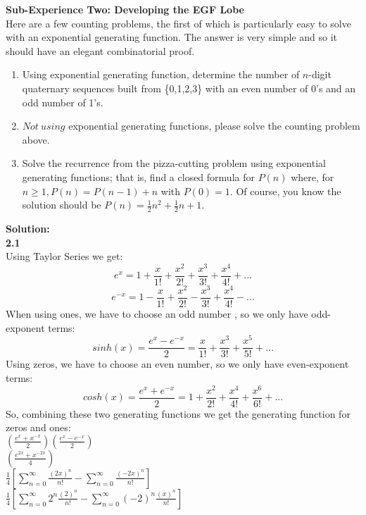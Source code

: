\documentclass[10pt,a4paper]{report}
\begin{document}
	\textbf{Sub-Experience Two: Developing the EGF Lobe}\\
	Here are a few counting problems, the first of which is particularly easy to solve with an exponential generating function.  The answer is very simple and so it should have an elegant combinatorial proof.
	\begin{enumerate}
		\item Using exponential generating function, determine the number of $n$-digit quaternary sequences built from \{0,1,2,3\} with an even number of 0's and an odd number of 1's.
		\item $Not\ using$ exponential generating functions, please solve the counting problem above.
		\item Solve the recurrence from the pizza-cutting problem using exponential generating functions; that is, find a closed formula for $P(n)$ where, for $n\geq1, P(n) = P(n-1) + n$ with $P(0) = 1$.  Of course, you know the solution should be $P(n) = \frac{1}{2}n^2 + \frac{1}{2}n + 1$.
	\end{enumerate}
	\textbf{Solution: }\\
	\newline
	\textbf{2.1}\\
	Using Taylor Series we get:\\
	\[e^x = 1 + \frac{x}{1!} + \frac{x^2}{2!} + \frac{x^3}{3!} + \frac{x^4}{4!} + ...\]
	\[e^{-x} = 1 - \frac{x}{1!} + \frac{x^2}{2!} - \frac{x^3}{3!} + \frac{x^4}{4!} - ...\]
	When using ones, we have to choose an odd number , so we only have odd-exponent terms:\\
	\[sinh(x) = \frac{e^x - e^{-x}}{2} = \frac{x}{1!} + \frac{x^3}{3!} + \frac{x^5}{5!} + ...\]
	Using zeros, we have to choose an even number, so we only have even-exponent terms:\\
	\[cosh(x) = \frac{e^x + e^{-x}}{2} = 1 + \frac{x^2}{2!} + \frac{x^4}{4!} + \frac{x^6}{6!} + ...\]
	So, combining these two generating functions we get the generating function for zeros and ones:\\
	$(\frac{e^x + x^{-x}}{2})(\frac{e^x - e^{-x}}{2}) $\\
	$(\frac{e^{2x} + x^{-2x}}{4})$\\
	$\frac{1}{4}[\sum_{n=0}^{\infty}\frac{(2x)^n}{n!} - \sum_{n=0}^{\infty}\frac{(-2x)^n}{n!}]$\\
	$\frac{1}{4}[\sum_{n=0}^{\infty}2^n\frac{(2)^n}{n!} - \sum_{n=0}^{\infty}(-2)^n\frac{(x)^n}{n!}]$\\
\end{document}
